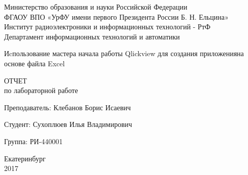 \begin{center}
    Министерство образования и науки Российской Федерации\\
    ФГАОУ ВПО  «УрФУ имени первого Президента России Б. Н. Ельцина»\\
    Институт радиоэлектроники и информационных технологий - РтФ\\
    Департамент информационных технологий и автоматики
    \par
    \vspace{4.5cm}
    \Large{
      Иcпользование мастера начала работы Qlickview для создания приложенияна основе файла Excel


      \par
      \vspace{0.5cm}

      ОТЧЕТ\\
      по лабораторной работе
    }

    \vspace{4cm}
    {
      Преподаватель: \hfill Клебанов Борис Исаевич
    }
    \par
    {
      Студент: \hfill Сухоплюев Илья Владимирович
    }
    \par
    {
      Группа: \hfill РИ-440001
    }

    \par
    \vspace{3.5cm}
    Екатеринбург\\
    2017
\end{center}

